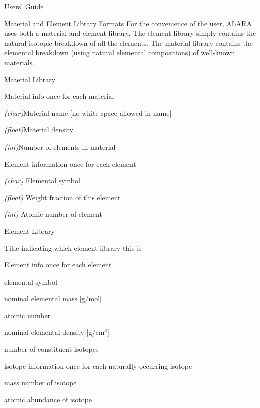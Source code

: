 \begin{chapter}{Users' Guide\label{app:user.guide}}
\begin{section}{Material and Element Library Formats}
    For the convenience of the user, ALARA uses both a material and
    element library.  The element library simply contains the natural
    isotopic breakdown of all the elements.  The material library
    contains the elemental breakdown (using natural elemental
    compositions) of well-known materials.     
    
    \begin{subsection}{Material Library\label{app:user.matlib}}
      
      \begin{binaryFile}
      \item Material info once for each material
        \begin{binaryFile}
        \item {\em (char)}Material name [no white space allowed in name]
        \item {\em (float)}Material density
        \item {\em (int)}Number of elements in material
        \item Element information once for each element
          \begin{binaryFile}
          \item {\em (char)} Elemental symbol
          \item {\em (float)} Weight fraction of this element
          \item {\em (int)} Atomic number of element
          \end{binaryFile}
        \end{binaryFile}
      \end{binaryFile}
    \end{subsection}

    \begin{subsection}{Element Library\label{app:user.elelib}}
      
      \begin{binaryFile}
      \item Title indicating which element library this is
      \item Element info once for each element
        \begin{binaryFile}
        \item elemental symbol
        \item nominal elemental mass [g/mol]
        \item atomic number
        \item nominal elemental density [g/cm$^3$]
        \item number of constituent isotopes
        \item isotope information once for each naturally occurring isotope
          \begin{binaryFile}
          \item mass number of isotope
          \item atomic abundance of isotope  
          \end{binaryFile}
        \end{binaryFile}
      \end{binaryFile}


\end{subsection}
\end{section}
\end{chapter}
